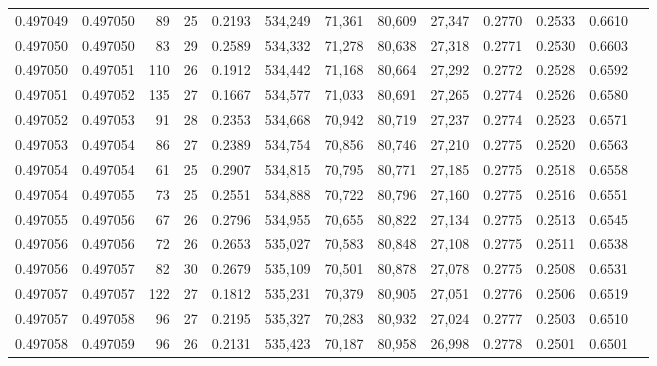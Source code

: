 \begin{tabular}{rrrrrrrrrrrrr}
0.497049 & 0.497050 &  89 &  25 &                                     0.2193 & 534,249 &  71,361 &  80,609 &  27,347 & 0.2770 & 0.2533 & 0.6610 \\
0.497050 & 0.497050 &  83 &  29 &                                     0.2589 & 534,332 &  71,278 &  80,638 &  27,318 & 0.2771 & 0.2530 & 0.6603 \\
0.497050 & 0.497051 & 110 &  26 &                                     0.1912 & 534,442 &  71,168 &  80,664 &  27,292 & 0.2772 & 0.2528 & 0.6592 \\
0.497051 & 0.497052 & 135 &  27 &                                     0.1667 & 534,577 &  71,033 &  80,691 &  27,265 & 0.2774 & 0.2526 & 0.6580 \\
0.497052 & 0.497053 &  91 &  28 &                                     0.2353 & 534,668 &  70,942 &  80,719 &  27,237 & 0.2774 & 0.2523 & 0.6571 \\
0.497053 & 0.497054 &  86 &  27 &                                     0.2389 & 534,754 &  70,856 &  80,746 &  27,210 & 0.2775 & 0.2520 & 0.6563 \\
0.497054 & 0.497054 &  61 &  25 &                                     0.2907 & 534,815 &  70,795 &  80,771 &  27,185 & 0.2775 & 0.2518 & 0.6558 \\
0.497054 & 0.497055 &  73 &  25 &                                     0.2551 & 534,888 &  70,722 &  80,796 &  27,160 & 0.2775 & 0.2516 & 0.6551 \\
0.497055 & 0.497056 &  67 &  26 &                                     0.2796 & 534,955 &  70,655 &  80,822 &  27,134 & 0.2775 & 0.2513 & 0.6545 \\
0.497056 & 0.497056 &  72 &  26 &                                     0.2653 & 535,027 &  70,583 &  80,848 &  27,108 & 0.2775 & 0.2511 & 0.6538 \\
0.497056 & 0.497057 &  82 &  30 &                                     0.2679 & 535,109 &  70,501 &  80,878 &  27,078 & 0.2775 & 0.2508 & 0.6531 \\
0.497057 & 0.497057 & 122 &  27 &                                     0.1812 & 535,231 &  70,379 &  80,905 &  27,051 & 0.2776 & 0.2506 & 0.6519 \\
0.497057 & 0.497058 &  96 &  27 &                                     0.2195 & 535,327 &  70,283 &  80,932 &  27,024 & 0.2777 & 0.2503 & 0.6510 \\
0.497058 & 0.497059 &  96 &  26 &                                     0.2131 & 535,423 &  70,187 &  80,958 &  26,998 & 0.2778 & 0.2501 & 0.6501 \\

\end{tabular}
